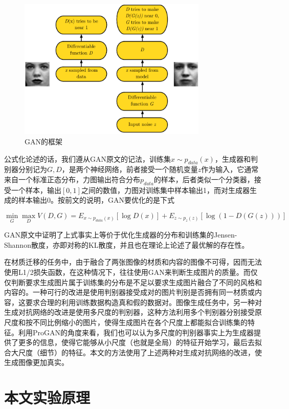 \documentclass[UTF8,openany,AutoFakeBold,AutoFakeSlant,cs4size]{ctexbook}
\begin{document}
\begin{figure}[h]
\centering
\includegraphics[width=9cm]{./images/gan_model.png}
\caption{GAN的框架}
\label{fig:sample}
\end{figure}

公式化论述的话，我们遵从GAN原文的记法，训练集$x \sim p_{data}(x)$，生成器和判别器分别记为$G, D$，是两个神经网络，前者接受一个随机变量$z$作为输入，它通常来自一个标准正态分布，力图输出符合分布$p_{data}$的样本，后者类似一个分类器，接受一个样本，输出$[0, 1]$之间的数值，力图对训练集中样本输出1，而对生成器生成的样本输出0。按前文的说明，GAN要优化的是下式

\begin{equation}
	\min_{G} \max_{D} V(D, G) = E_{x \sim p_{data}(x)}[\log D(x)] + E_{z \sim p_{z}(z)}[\log (1 - D(G(z)))]
\end{equation}

GAN原文中证明了上式事实上等价于优化生成器的分布和训练集的Jensen-Shannon散度，亦即对称的KL散度，并且也在理论上论述了最优解的存在性。


在材质迁移的任务中，由于融合了两张图像的材质和内容的图像不可得，因而无法使用L1/2损失函数，在这种情况下，往往使用GAN来判断生成图片的质量。而仅仅判断要求生成图片属于训练集的分布是不足以要求生成图片融合了不同的风格和内容的。一种可行的改进是使用判别器接受成对的图片判别是否拥有同一材质或内容\cite{ma2017pose}，这要求合理的利用训练数据构造真和假的数据对。图像生成任务中，另一种对生成对抗网络的改进是使用多尺度的判别器，这种方法利用多个判别器分别接受原尺度和按不同比例缩小的图片，使得生成图片在各个尺度上都能拟合训练集的特征。利用ProGAN\cite{Karras2017ProgressiveGO}的角度来看，我们也可以认为多尺度的判别器事实上为生成器提供了更多的信息，使得它能够从小尺度（也就是全局）的特征开始学习，最后去拟合大尺度（细节）的特征。本文的方法使用了上述两种对生成对抗网络的改进，使生成图像更加真实。

\section{本文实验原理}
\end{document}
